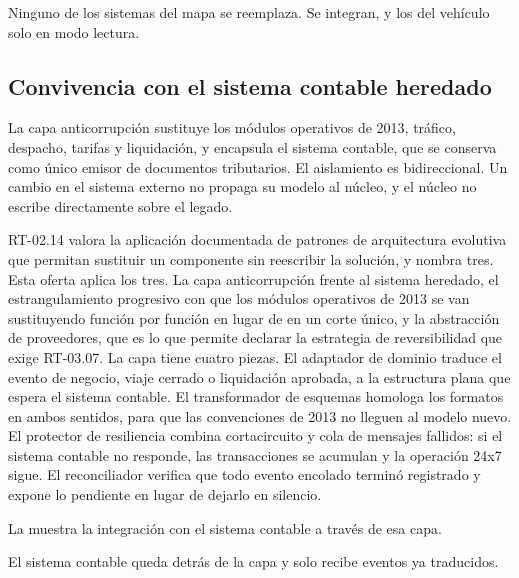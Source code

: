 Ninguno de los sistemas del mapa se reemplaza. Se integran, y los del vehículo solo en modo lectura.

\subsection{Convivencia con el sistema contable heredado}\label{sec:4-contable}

La capa anticorrupción sustituye los módulos operativos de 2013, tráfico, despacho, tarifas y
liquidación, y encapsula el sistema contable, que se conserva como único emisor de documentos
tributarios. El aislamiento es bidireccional. Un cambio en el sistema externo no propaga su modelo al
núcleo, y el núcleo no escribe directamente sobre el legado.

RT-02.14 valora la aplicación documentada de patrones de arquitectura evolutiva que permitan
sustituir un componente sin reescribir la solución, y nombra tres. Esta oferta aplica los tres. La capa
anticorrupción frente al sistema heredado, el estrangulamiento progresivo con que los módulos
operativos de 2013 se van sustituyendo función por función en lugar de en un corte único, y la
abstracción de proveedores, que es lo que permite declarar la estrategia de reversibilidad que exige
RT-03.07. La capa tiene cuatro piezas. El adaptador de dominio traduce el evento de
negocio, viaje cerrado o liquidación aprobada, a la estructura plana que espera el sistema contable. El
transformador de esquemas homologa los formatos en ambos sentidos, para que las convenciones de 2013 no
lleguen al modelo nuevo. El protector de resiliencia combina cortacircuito y cola de mensajes fallidos:
si el sistema contable no responde, las transacciones se acumulan y la operación 24x7 sigue. El
reconciliador verifica que todo evento encolado terminó registrado y expone lo pendiente en lugar de
dejarlo en silencio.

La  muestra la integración con el sistema contable a través de esa capa.


El sistema contable queda detrás de la capa y solo recibe eventos ya traducidos.


